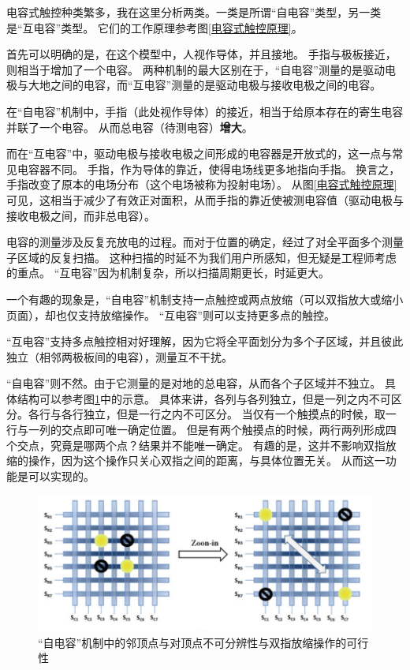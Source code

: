 \documentclass[UTF-8]{ctexart}
\begin{document}
电容式触控种类繁多，我在这里分析两类。一类是所谓“自电容”类型，另一类是“互电容”类型。
它们的工作原理参考图\ref{电容式触控原理}。

首先可以明确的是，在这个模型中，人视作导体，并且接地。
手指与极板接近，则相当于增加了一个电容。
两种机制的最大区别在于，“自电容”测量的是驱动电极与大地之间的电容，而“互电容”测量的是驱动电极与接收电极之间的电容。

在“自电容”机制中，手指（此处视作导体）的接近，相当于给原本存在的寄生电容并联了一个电容。
从而总电容（待测电容）\textbf{增大}。

而在“互电容”中，驱动电极与接收电极之间形成的电容器是开放式的，这一点与常见电容器不同。
手指，作为导体的靠近，使得电场线更多地指向手指。
换言之，手指改变了原本的电场分布（这个电场被称为投射电场）。
从图\ref{电容式触控原理}可见，这相当于减少了有效正对面积，从而手指的靠近使被测电容值（驱动电极与接收电极之间，而非总电容）\cite{Capacitive}。

电容的测量涉及反复充放电的过程。而对于位置的确定，经过了对全平面多个测量子区域的反复扫描。
这种扫描的时延不为我们用户所感知，但无疑是工程师考虑的重点。
“互电容”因为机制复杂，所以扫描周期更长，时延更大。

一个有趣的现象是，“自电容”机制支持一点触控或两点放缩（可以双指放大或缩小页面），却也仅支持放缩操作。
“互电容”则可以支持更多点的触控。

“互电容”支持多点触控相对好理解，因为它将全平面划分为多个子区域，并且彼此独立（相邻两极板间的电容），测量互不干扰。

“自电容”则不然。由于它测量的是对地的总电容，从而各个子区域并不独立。
具体结构可以参考图\ref{“自电容”机制中的邻顶点与对顶点}中的示意。
具体来讲，各列与各列独立，但是一列之内不可区分。各行与各行独立，但是一行之内不可区分。
当仅有一个触摸点的时候，取一行与一列的交点即可唯一确定位置。
但是有两个触摸点的时候，两行两列形成四个交点，究竟是哪两个点？结果并不能唯一确定。
有趣的是，这并不影响双指放缩的操作，因为这个操作只关心双指之间的距离，与具体位置无关。
从而这一功能是可以实现的。
\begin{figure}
    \centering
    \includegraphics[width=0.9\linewidth]{../Figures/self.png}
    \caption{“自电容”机制中的邻顶点与对顶点不可分辨性与双指放缩操作的可行性\cite{Touch}}
    \label{“自电容”机制中的邻顶点与对顶点}
\end{figure}
\end{document}
